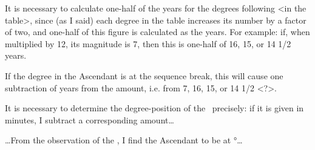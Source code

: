 It is necessary to calculate one-half of the years for the degrees following <in the table>, since (as I said) each degree in the table increases its number by a factor of two, and one-half of this figure is calculated as the years. For example: if, when multiplied by 12, its magnitude is 7, then this is one-half of 16, 15, or 14 1/2 years. 

If the degree in the Ascendant is at the sequence break, this will cause one subtraction of years from the amount, i.e. from 7, 16, 15, or 14 1/2 <?>.

It is necessary to determine the degree-position of the \Sun\, precisely: if it is given in minutes, I subtract a corresponding amount…

…From the observation of the \Sun, I find the Ascendant to be at °…

\newpage